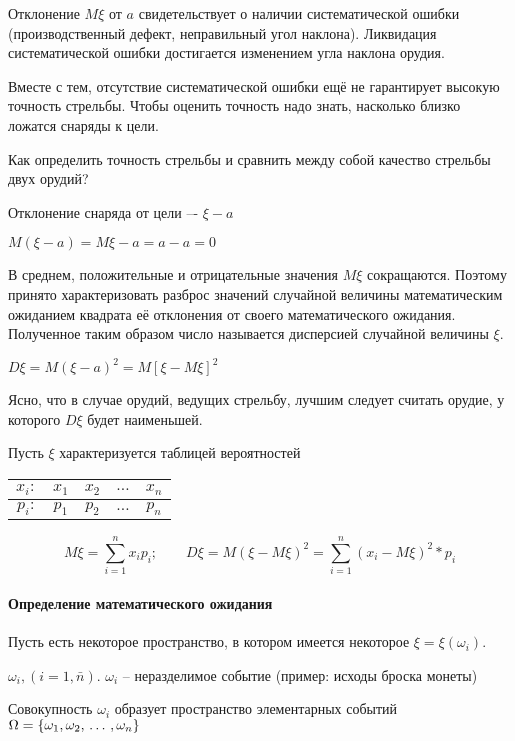 \documentclass[a4paper,twoside,12pt]{report}
\begin{document}
	Отклонение $M\xi$ от $a$ свидетельствует о наличии систематической ошибки (производственный дефект, неправильный угол наклона). Ликвидация систематической ошибки достигается изменением угла наклона орудия. 

	Вместе с тем, отсутствие систематической ошибки ещё не гарантирует высокую точность стрельбы. Чтобы оценить точность надо знать, насколько близко ложатся снаряды к цели. 

	Как определить точность стрельбы и сравнить между собой качество стрельбы двух орудий?

	Отклонение снаряда от цели –- $\xi - a$
	
	$M(\xi - a) = M\xi - a = a - a = 0$

	В среднем, положительные и отрицательные значения $M\xi$ сокращаются. Поэтому принято характеризовать разброс значений случайной величины математическим ожиданием квадрата её отклонения от своего математического ожидания. Полученное таким образом число называется дисперсией случайной величины $\xi$. 

	$D\xi = M(\xi-a)^2 = M[\xi-M\xi]^2$

	Ясно, что в случае орудий, ведущих стрельбу, лучшим следует считать орудие, у которого $D\xi$ будет наименьшей.

	Пусть $\xi$ характеризуется таблицей вероятностей \strut


	\begin{tabular}{|r|c|c|c|c|}
	\hline
		$x_i:$ & $x_1$ & $x_2$ & $\ldots$ & $x_n$\\
	\hline	
		$p_i:$ & $p_1$ & $p_2$ & $\ldots$ & $p_n$\\
	\hline
	\end{tabular}

	
	$$
	  M\xi = \sum^n_{i=1}x_ip_i;
	  \qquad
	  D\xi = M (\xi - M\xi)^2 
	       = \sum^n_{i=1}(x_i-M\xi)^2*p_i
	$$



\paragraph{Определение математического ожидания}

	Пусть есть некоторое пространство, в котором имеется некоторое $\xi = \xi(\omega_i)$.

	$\omega_i,(i=1,\bar n)$. $\omega_i$ – неразделимое событие (пример: исходы броска монеты)

	Совокупность $\omega_i$ образует пространство элементарных событий
	$\Omega = \{ \omega_1, \omega_2, \,\ldots\,, \omega_n \}$
\end{document}
